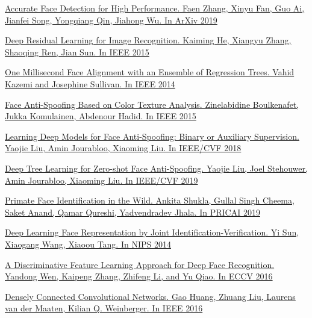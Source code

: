 \documentclass[a4paper,14pt]{extarticle}
\begin{document}
\begin{thebibliography}{0}
        \hypertarget{face_detection3}{}
        \href{https://arxiv.org/abs/1905.01585}
        {Accurate Face Detection for High Performance. Faen Zhang, Xinyu Fan, Guo Ai, Jianfei Song, Yongqiang Qin, Jiahong Wu. In ArXiv 2019}

        \hypertarget{resnet}{}
        \href{https://arxiv.org/abs/1512.03385}
        {Deep Residual Learning for Image Recognition. Kaiming He, Xiangyu Zhang, Shaoqing Ren, Jian Sun. In IEEE 2015}

        \hypertarget{align}{}
        \href{http://www.csc.kth.se/~vahidk/papers/KazemiCVPR14.pdf}
        {One Millisecond Face Alignment with an Ensemble of Regression Trees. Vahid Kazemi and Josephine Sullivan. In IEEE 2014}

        \hypertarget{lpb}{}
        \href{https://arxiv.org/abs/1511.06316}
        {Face Anti-Spoofing Based on Color Texture Analysis. Zinelabidine Boulkenafet, Jukka Komulainen, Abdenour Hadid. In IEEE 2015}

        \hypertarget{lpb2}{}
        \href{https://arxiv.org/abs/1803.11097}
        {Learning Deep Models for Face Anti-Spoofing: Binary or Auxiliary Supervision. Yaojie Liu, Amin Jourabloo, Xiaoming Liu. In IEEE/CVF 2018}

        \hypertarget{lpb3}{}
        \href{https://arxiv.org/abs/1904.02860}
        {Deep Tree Learning for Zero-shot Face Anti-Spoofing. Yaojie Liu, Joel Stehouwer, Amin Jourabloo, Xiaoming Liu. In IEEE/CVF 2019}

        \hypertarget{pfid}{}
        \href{https://arxiv.org/abs/1907.02642}
        {Primate Face Identification in the Wild. Ankita Shukla, Gullal Singh Cheema, Saket Anand, Qamar Qureshi, Yadvendradev Jhala. In PRICAI 2019}

        \hypertarget{pfid2}{}
        \href{https://arxiv.org/abs/1406.4773}
        {Deep Learning Face Representation by Joint Identification-Verification. Yi Sun, Xiaogang Wang, Xiaoou Tang. In NIPS 2014}

        \hypertarget{pfid3}{}
        \href{https://ydwen.github.io/papers/WenECCV16.pdf}
        {A Discriminative Feature Learning Approach for Deep Face Recognition. Yandong Wen, Kaipeng Zhang, Zhifeng Li, and Yu Qiao. In ECCV 2016}

        \hypertarget{densenet}{}
        \href{https://arxiv.org/abs/1608.06993}
        {Densely Connected Convolutional Networks. Gao Huang, Zhuang Liu, Laurens van der Maaten, Kilian Q. Weinberger. In IEEE 2016}


\end{thebibliography}
\end{document}
